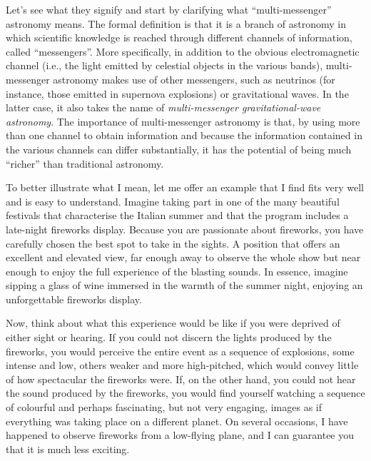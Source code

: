 Let's see what they signify and start by clarifying what ``multi-messenger'' astronomy
means. The formal definition is that it is a branch of astronomy in which scientific
knowledge is reached through different channels of information, called ``messengers''.
More specifically, in addition to the obvious electromagnetic channel (i.e., the light
emitted by celestial objects in the various bands), multi-messenger astronomy makes use
of other messengers, such as
neutrinos (for instance, those
emitted in supernova explosions) or gravitational waves. In the latter case, it also
takes the name of \emph{multi-messenger gravitational-wave
astronomy}. The importance of multi-messenger astronomy is that, by
using more than one channel to obtain information and because the information contained
in the various channels can differ substantially, it has the potential of being much
``richer'' than traditional astronomy.

To better illustrate what I mean, let me offer an example that I find fits very well and
is easy to understand. Imagine taking part in one of the many beautiful festivals that
characterise the Italian summer and that the program includes a late-night fireworks
display. Because you are passionate about fireworks, you have carefully chosen the best
spot to take in the sights. A position that offers an excellent and elevated view, far
enough away to observe the whole show but near enough to enjoy the full experience of
the blasting sounds. In essence, imagine sipping a glass of wine immersed in the warmth
of the summer night, enjoying an unforgettable fireworks display.

Now, think about what this experience would be like if you were deprived of either sight
or hearing. If you could not discern the lights produced by the fireworks, you would
perceive the entire event as a sequence of explosions, some intense and low, others
weaker and more high-pitched, which would convey little of how spectacular the fireworks
were. If, on the other hand, you could not hear the sound produced by the fireworks, you
would find yourself watching a sequence of colourful and perhaps fascinating, but not
very engaging, images as if everything was taking place on a different planet. On
several occasions, I have happened to observe fireworks from a low-flying plane, and I
can guarantee you that it is much less exciting.


